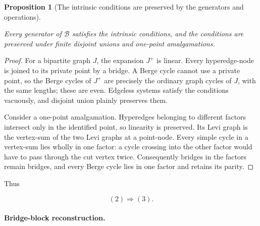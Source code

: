 \documentclass[a4paper,11pt,reqno]{amsart}
\theoremstyle{plain}
\newtheorem{proposition}[theorem]{Proposition}
\theoremstyle{definition}
\theoremstyle{remark}
\begin{document}
\begin{proposition}[The intrinsic conditions are preserved by the generators and operations]\label{proposition-5.1-the-intrinsic-conditions-are-preserved-by-the-generators-and-operations}

Every generator of \(\mathcal B\) satisfies the intrinsic conditions, and the conditions are preserved under finite disjoint unions and one-point amalgamations.

\end{proposition}
\begin{proof}
For a bipartite graph \(J\), the expansion \(J^+\) is linear. Every hyperedge-node is joined to its private point by a bridge. A Berge cycle cannot use a private point, so the Berge cycles of \(J^+\) are precisely the ordinary graph cycles of \(J\), with the same lengths; these are even. Edgeless systems satisfy the conditions vacuously, and disjoint union plainly preserves them.

Consider a one-point amalgamation. Hyperedges belonging to different factors intersect only in the identified point, so linearity is preserved. Its Levi graph is the vertex-sum of the two Levi graphs at a point-node. Every simple cycle in a vertex-sum lies wholly in one factor: a cycle crossing into the other factor would have to pass through the cut vertex twice. Consequently bridges in the factors remain bridges, and every Berge cycle lies in one factor and retains its parity.
\end{proof}

Thus

\[
(2)\Longrightarrow(3). \tag{5.1}
\]

\paragraph{Bridge-block reconstruction.}\label{bridge-block-reconstruction}
\end{document}

